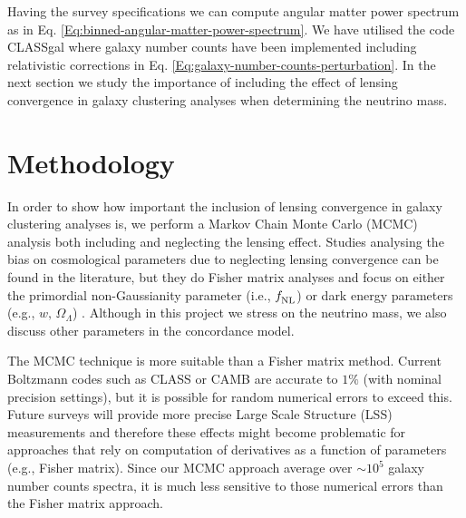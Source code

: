 Having the survey specifications we can compute angular matter power spectrum as in Eq. \eqref{Eq:binned-angular-matter-power-spectrum}. We have utilised the code CLASSgal \cite{DiDio:2013bqa} where galaxy number counts have been implemented including relativistic corrections in Eq. \eqref{Eq:galaxy-number-counts-perturbation}. 
In the next section we study the importance of including the effect of lensing convergence in galaxy clustering analyses when determining the neutrino mass. 

 
\section{Methodology}
\label{chapter-mnu:methodology}

In order to show how important the inclusion of lensing convergence in galaxy clustering analyses is, we perform a Markov Chain Monte Carlo (MCMC) analysis \cite{Lewis:2002ah,Verde:2003ey,Tegmark:2003ud} both including and neglecting the lensing effect. Studies analysing the bias on cosmological parameters due to neglecting lensing convergence can be found in the literature, but they do Fisher matrix analyses and focus on either the primordial non-Gaussianity parameter (i.e., $f_{\rm NL}^{}$) \cite{Namikawa:2011yr} or dark energy parameters (e.g., $w,\, \Omega_\Lambda$) \cite{Duncan:2013haa}. Although in this project we stress on the neutrino mass, we also discuss other parameters in the concordance model.  

The MCMC technique is more suitable than a Fisher matrix method. Current Boltzmann codes such as CLASS \cite{Lesgourgues:2011re} or CAMB \cite{Lewis:1999bs} are accurate to $1\%$ (with nominal precision settings), but it is possible for random numerical errors to exceed this. Future surveys will provide more precise Large Scale Structure (LSS) measurements and therefore these effects might become problematic for approaches that rely on computation of derivatives as a function of parameters (e.g., Fisher matrix). Since our MCMC approach average over $\sim 10^5$ galaxy number counts spectra, it is much less sensitive to those numerical errors than the Fisher matrix approach. 

